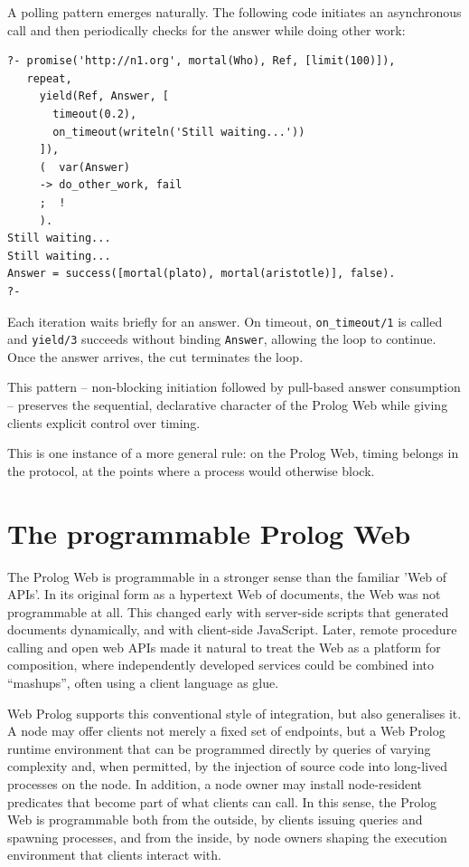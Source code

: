 A polling pattern emerges naturally. The following code initiates an asynchronous call and then periodically checks for the answer while doing other work:

\begin{verbatim}
?- promise('http://n1.org', mortal(Who), Ref, [limit(100)]),
   repeat,
     yield(Ref, Answer, [
       timeout(0.2),
       on_timeout(writeln('Still waiting...'))
     ]),
     (  var(Answer)
     -> do_other_work, fail
     ;  !
     ).
Still waiting...
Still waiting...
Answer = success([mortal(plato), mortal(aristotle)], false).
?-
\end{verbatim}

\noindent Each iteration waits briefly for an answer. On timeout, \texttt{on\_timeout/1} is called and \texttt{yield/3} succeeds without binding \texttt{Answer}, allowing the loop to continue. Once the answer arrives, the cut terminates the loop. 

This pattern -- non-blocking initiation followed by pull-based answer consumption -- preserves the sequential, declarative character of the Prolog Web while giving clients explicit control over timing.

\medskip
\noindent This is one instance of a more general rule: on the Prolog Web, timing belongs in the protocol, at the points where a process would otherwise block.

\section{The programmable Prolog Web}\label{sec:programmable-prolog-web}

The Prolog Web is programmable in a stronger sense than the familiar 'Web of APIs'. In its original form as a hypertext Web of
documents, the Web was not programmable at all. This changed early
with server-side scripts that generated documents dynamically, and
with client-side JavaScript. Later, remote procedure calling and
open web APIs made it natural to treat the Web as a platform for
composition, where independently developed services could be
combined into ``mashups'', often using a client language as glue.

Web Prolog supports this conventional style of integration, but also
generalises it. A node may offer clients not merely a fixed set of
endpoints, but a Web Prolog runtime environment that can be
programmed directly by queries of varying complexity and, when
permitted, by the injection of source code into long-lived processes
on the node. In addition, a node owner may install node-resident
predicates that become part of what clients can call. In this sense,
the Prolog Web is programmable both from the outside, by clients
issuing queries and spawning processes, and from the inside, by node
owners shaping the execution environment that clients interact with.

